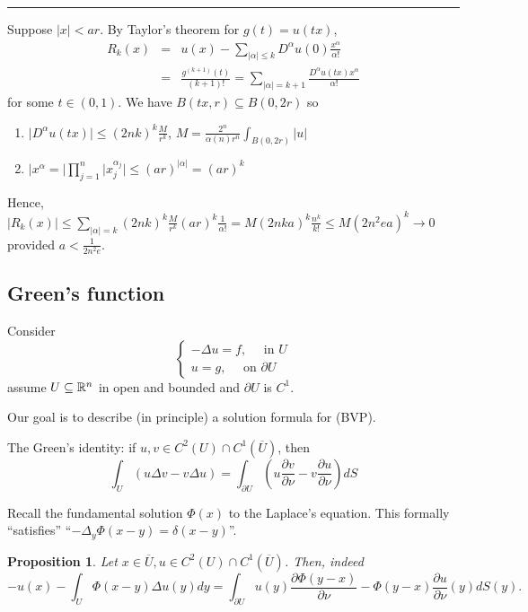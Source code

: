 \documentclass[11pt]{amsart}%
\newtheorem{proposition}[theorem]{Proposition}
\begin{document}
\begin{center}\rule{0.5\linewidth}{\linethickness}\end{center}

Suppose $\vert x\vert <ar$. By Taylor's theorem for $g(t)=u(tx)$,
\begin{eqnarray*}
    R_k(x)  &=& u(x)-\sum_{\vert \alpha\vert\le k} D^\alpha u(0)\frac{x^\alpha}{\alpha!}\\
        &=& \frac{g^{(k+1)}(t)}{(k+1)!} = \sum_{\vert \alpha\vert =k+1} \frac{D^\alpha u(tx)x^\alpha}{\alpha!}
\end{eqnarray*}
for some $t\in (0,1)$. We have $B(tx,r)\subseteq B(0,2r)$ so
\begin{enumerate}
    \item $\vert D^\alpha u(tx)\vert \le (2nk)^k\frac{M}{r^k}$, $M=\frac{2^n}{\alpha(n)r^n}\int_{B(0,2r)}\vert u\vert$
    \item $\vert x^\alpha=\vert \prod^n_{j=1}\vert x_j^{\alpha_j}\vert \le (ar)^{\vert \alpha\vert} = (ar)^k$
\end{enumerate}
Hence, $|R_k(x)| \le \sum_{\vert \alpha\vert =k} (2nk)^k\frac{M}{r^k}(ar)^k\frac{1}{\alpha!} = M(2nka)^k\frac{n^k}{k!} \le M(2n^2ea)^k\to 0$ provided $a<\frac{1}{2n^2e}$.

\subsection*{Green's function} Consider
\[\begin{cases}
    -\Delta u =f, \quad \text{ in $U$}\\
    u=g, \quad \text{ on $\partial U$}
\end{cases} \tag{BVP}\]
assume $U\subseteq \mathbb{R}^n$ in open and bounded and $\partial U$ is $C^1$.

Our goal is to describe (in principle) a solution formula for (BVP).

The Green's identity: if $u, v\in C^2(U)\cap C^1(\overline{U})$, then
\[ \int_U ( u\Delta v - v\Delta u) = \int_{\partial U}(u\frac{\partial v}{\partial \nu} - v\frac{\partial u}{\partial \nu})dS \tag{*}\]

Recall the fundamental solution $\Phi(x)$ to the Laplace's equation. This formally ``satisfies'' ``$-\Delta_y\Phi(x-y)=\delta(x-y)$''.

\begin{proposition}
    Let $x\in \overline{U}, u\in C^2(U)\cap C^1(\overline{U})$. Then, indeed
    $$-u(x)-\int_U\Phi(x-y)\Delta u(y) dy =\int_{\partial U}  u(y)\frac{\partial \Phi(y-x)}{\partial \nu} -\Phi(y-x)\frac{\partial u}{\partial \nu}(y)dS(y).$$
\end{proposition}
\end{document}
